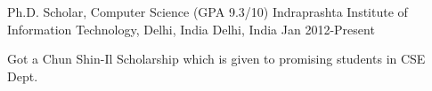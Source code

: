 \begin{cventries}
  \cventry
    {Ph.D. Scholar, Computer Science (GPA 9.3/10)}
    {Indraprashta Institute of Information Technology, Delhi, India}
    {Delhi, India}
    {Jan 2012-Present}
    {
      \begin{cvitems}
        \item {Got a Chun Shin-Il Scholarship which is given to promising students in CSE Dept.}
      \end{cvitems}
    }
\end{cventries}
